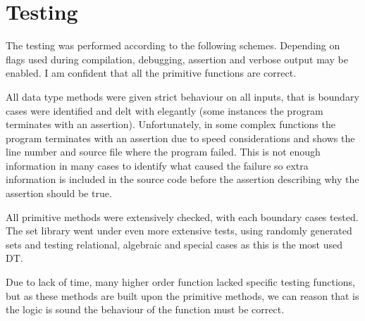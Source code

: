 \section{Testing}

The testing was performed according to the following schemes. Depending on
flags used during compilation, debugging, assertion and verbose output may be
enabled. I am confident that all the primitive functions are correct. 

	All data type methods were given strict behaviour on all inputs, that
is boundary cases were identified and delt with elegantly (some instances the
program terminates with an assertion). Unfortunately, in some complex functions
the program terminates with an assertion due to speed considerations and shows
the line number and source file where the program failed. This is not enough
information in many cases to identify what caused the failure so extra
information is included in the source code before the assertion describing why
the assertion should be true.

	All primitive methods were extensively checked, with each boundary
cases tested. The set library went under even more extensive tests, using
randomly generated sets and testing relational, algebraic and special cases as
this is the most used DT.

	Due to lack of time, many higher order function lacked specific testing
functions, but as these methods are built upon the primitive methods, we can
reason that is the logic is sound the behaviour of the function must be
correct. 
